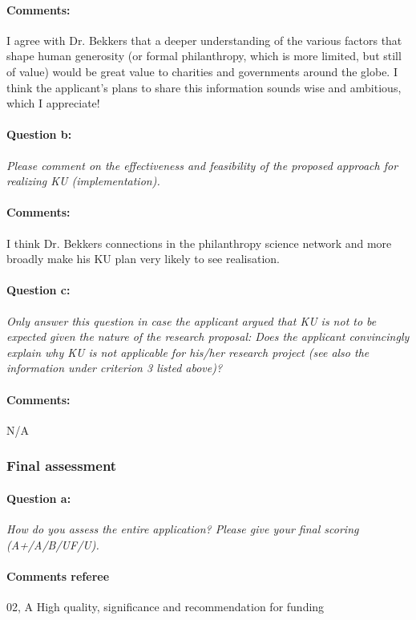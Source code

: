 \documentclass[twocolumn, serif, rga, numeric]{jote-article}
\begin{document}
\paragraph{Comments:}
I agree with Dr. Bekkers that a deeper understanding of the various factors that shape human generosity (or formal philanthropy, which is more limited, but still of value) would be great value to charities and governments around the globe. I think the applicant's plans to share this information sounds wise and ambitious, which I appreciate!
\paragraph{Question b:}
\textit{Please comment on the effectiveness and feasibility of the proposed approach for realizing KU (implementation).}
\paragraph{Comments:}
I think Dr. Bekkers connections in the philanthropy science network and more broadly make his KU plan very likely to see realisation.
\paragraph{Question c:}
\textit{Only answer this question in case the applicant argued that KU is not to be expected given the nature of the research proposal: Does the applicant convincingly explain why KU is not applicable for his/her research project (see also the information under criterion 3 listed above)?}
\paragraph{Comments:}
N/A
 {}\subsubsection*{Final assessment} 
\paragraph{Question a:}
\textit{How do you assess the entire application? Please give your final scoring (A+/A/B/UF/U).}
\paragraph{Comments referee}
02, A High quality, significance and recommendation for funding
\end{document}

